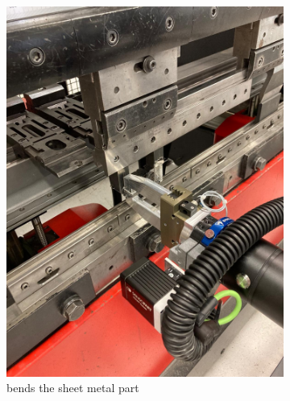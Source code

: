 \begin{figure}[h]
\begin{subfigure}[b]{0.32\textwidth}
        \includegraphics[width=\textwidth]{figures/bending/bending4-002.png}
        \caption{bends the sheet metal part}
        \label{subfig:bending4}
    \end{subfigure}\hspace{0.1cm}
    \begin{subfigure}[b]{0.32\textwidth}
        \centering

\end{subfigure}
\end{figure}
